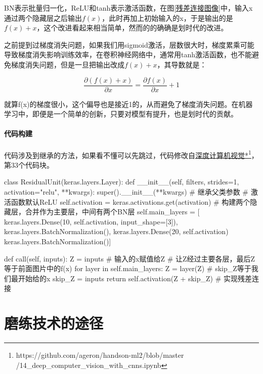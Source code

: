 \documentclass[a5paper, 11pt]{ctexbook}
\begin{document}
BN表示批量归一化，ReLU和tanh表示激活函数，在图\ref{残差连接图像}中，输入x通过两个隐藏层之后输出$f(x)$，此时再加上初始输入的x，于是输出的是$f(x)+x$，这个改进看起来相当简单，然而的的确确是划时代的改进。

之前提到过梯度消失问题，如果我们用sigmoid激活，层数很大时，梯度累乘可能导致梯度消失影响训练效率，在卷积神经网络中，通常用tanh激活函数，也不能避免梯度消失问题，但是一旦把输出改成$f(x)+x$，其导数就是：

\begin{equation}
    \frac{\partial{(f(x)+x)}}{\partial{x}} = \frac{\partial{f(x)}}{\partial{x}} + 1
\end{equation}

就算f(x)的梯度很小，这个偏导也是接近1的，从而避免了梯度消失问题。在机器学习中，即便是一个简单的创新，只要对模型有提升，也是划时代的贡献。

\subsubsection{代码构建}

代码涉及到继承的方法，如果看不懂可以先跳过，代码修改自\href{https://github.com/ageron/handson-ml2/blob/master/14_deep_computer_vision_with_cnns.ipynb}{深度计算机视觉*}\footnote{https://github.com/ageron/handson-ml2/blob/master\\/14\_deep\_computer\_vision\_with\_cnns.ipynb}，第33个代码块。

\begin{python}
class ResidualUnit(keras.layers.Layer):
    def __init__(self, filters, strides=1,
    activation="relu", **kwargs):
    super().__init__(**kwargs) # 继承父类参数
    # 激活函数默认ReLU
    self.activation = keras.activations.get(activation)
    # 构建两个隐藏层，合并作为主要层，中间有两个BN层
    self.main_layers = [
    keras.layers.Dense(10, self.activation,
    input_shape=[3]),
    keras.layers.BatchNormalization(),
    keras.layers.Dense(20, self.activation)
    keras.layers.BatchNormalization()]

    def call(self, inputs):
    Z = inputs # 输入的x赋值给Z
    # 让Z经过主要各层，最后Z等于前面图片中的f(x)
    for layer in self.main_layers:
    Z = layer(Z)
    # skip_Z等于我们最开始给的x
    skip_Z = inputs
    return self.activation(Z + skip_Z) # 实现残差连接
\end{python}



\chapter{磨练技术的途径}
\end{document}
